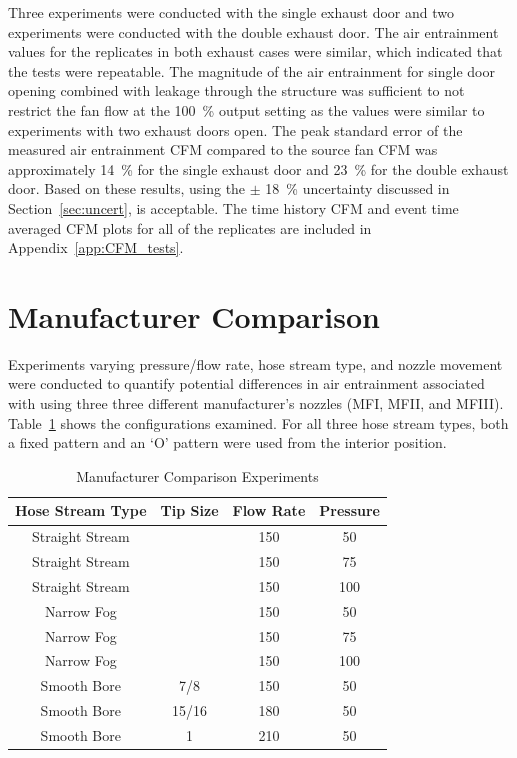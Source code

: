 \documentclass[12pt,oneside]{book}
\begin{document}
Three experiments were conducted with the single exhaust door and two experiments were conducted with the double exhaust door. The air entrainment values for the replicates in both exhaust cases were similar, which indicated that the tests were repeatable. The magnitude of the air entrainment for single door opening combined with leakage through the structure was sufficient to not restrict the fan flow at the 100~\% output setting as the values were similar to experiments with two exhaust doors open. The peak standard error of the measured air entrainment CFM compared to the source fan CFM was approximately 14~\% for the single exhaust door and 23~\% for the double exhaust door. Based on these results, using the $\pm$ 18~\% uncertainty discussed in Section~\ref{sec:uncert}, is acceptable. The time history CFM and event time averaged CFM plots for all of the replicates are included in Appendix~\ref{app:CFM_tests}.

\section{Manufacturer Comparison}
\label{sec:manu}

Experiments varying pressure/flow rate, hose stream type, and nozzle movement were conducted to quantify potential differences in air entrainment associated with using three three different manufacturer's nozzles (MFI, MFII, and MFIII). Table~\ref{tab:Manufacturer_Comparison_Experiments} shows the configurations examined. For all three hose stream types, both a fixed pattern and an `O' pattern were used from the interior position.

\begin{table}[!ht]
\centering
\caption{Manufacturer Comparison Experiments}
\label{tab:Manufacturer_Comparison_Experiments}
\begin{tabular}{cccc}
\toprule[1.5pt]
Hose Stream Type & Tip Size & Flow Rate & Pressure \\ 
\midrule
Straight Stream &       & 150 & 50 \\
Straight Stream &       & 150 & 75 \\
Straight Stream &       & 150 & 100 \\
Narrow Fog      &       & 150 & 50 \\
Narrow Fog      &       & 150 & 75 \\
Narrow Fog      &       & 150 & 100 \\
Smooth Bore     & 7/8   & 150 & 50 \\
Smooth Bore     & 15/16 & 180 & 50 \\
Smooth Bore     & 1     & 210 & 50 \\
\bottomrule[1.25pt]
\end{tabular}
\end{table}
\end{document}
